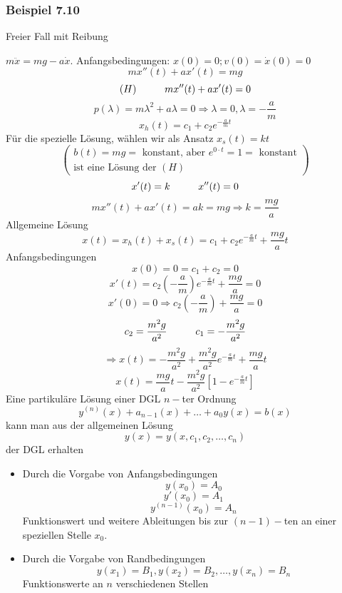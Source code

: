 \subsubsection*{Beispiel 7.10}
Freier Fall mit Reibung
\begin{center}
\end{center}
$m\ddot{x}=mg-a\dot{x}$. Anfangsbedingungen: $x(0)=0; v(0)=\dot{x}(0)=0$
\[mx''(t)+ax'(t)=mg\]
\[(H)\hspace{10mm}mx''(t)+ax'(t)=0\]
\[p(\lambda)=m\lambda^2+a\lambda=0\Rightarrow \lambda=0,\lambda=-\frac{a}{m}\]
\[x_h(t)=c_1+c_2e^{-\frac{a}{m}t}\]
Für die spezielle Lösung, wählen wir als Ansatz $x_s(t)=kt$
\[\left( \begin{array}{l}
b(t) = mg = {\text{ konstant, aber  }}{e^{0 \cdot t}} = 1 = {\text{ konstant}}\\
{\text{ist eine Lösung der }}(H)
\end{array} \right)\]
\[x'(t)=k\hspace{10mm}x''(t)=0\]
\[mx''(t)+ax'(t)=ak=mg\Rightarrow k=\frac{mg}{a}\]
Allgemeine Lösung
\[x(t)=x_h(t)+x_s(t)=c_1+c_2e^{-\frac{a}{m}t}+\frac{mg}{a}t\]
Anfangsbedingungen
\[x(0)=0=c_1+c_2=0\]
\[x'(t)=c_2\left(-\frac{a}{m}\right)e^{-\frac{a}{m}t}+\frac{mg}{a}=0\]
\[x'(0)=0\Rightarrow c_2\left( -\frac{a}{m}\right) +\frac{mg}{a}=0\]
\[c_2=\frac{m^2g}{a^2}\hspace{10mm}c_1=-\frac{m^2g}{a^2}\]
\[\Rightarrow x(t)=-\frac{m^2g}{a^2}+\frac{m^2g}{a^2}e^{-\frac{a}{m}t}+\frac{mg}{a}t\]
\[x(t)=\frac{mg}{a}t-\frac{m^2g}{a^2}\left[ 1-e^{-\frac{a}{m}t}\right]\]
Eine partikuläre Lösung einer DGL $n-$ter Ordnung \[y^{(n)}{(x)}+a_{n-1}(x)+\dots+a_0 y(x)=b(x)\] kann man aus der allgemeinen Lösung
\[y(x)=y(x,c_1,c_2,\dots,c_n)\] der DGL erhalten
\begin{itemize}
\item Durch die Vorgabe von Anfangsbedingungen
\[y(x_0)=A_0\]
\[y'(x_0)=A_1\]
\[y^{(n-1)}(x_0)=A_n\]
Funktionswert und weitere Ableitungen bis zur $(n-1)-$ten an einer speziellen Stelle $x_0$.
\item Durch die Vorgabe von Randbedingungen
\[y(x_1)=B_1, y(x_2)=B_2, \dots, y(x_n)=B_n\] Funktionswerte an $n$ verschiedenen Stellen
\end{itemize}
